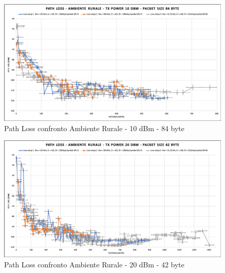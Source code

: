 \documentclass[12pt,a4paper,openright,twoside]{report}
\begin{document}
\begin{figure}[h]                      
\begin{center} 
\includegraphics[width=\textwidth]{PATH_LOSS_confronto_AR_10dBm_84byte.png}
\caption[Path Loss confronto Ambiente Rurale - 10 dBm - 84 byte]{Path Loss confronto Ambiente Rurale - 10 dBm - 84 byte}\label{fig:prima}
\end{center}
\end{figure}

\begin{figure}[h]                      
\begin{center} 
\includegraphics[width=\textwidth]{PATH_LOSS_confronto_AR_20dBm_42byte.png}
\caption[Path Loss confronto Ambiente Rurale - 20 dBm - 42 byte]{Path Loss confronto Ambiente Rurale - 20 dBm - 42 byte}\label{fig:prima}
\end{center}
\end{figure}
\end{document}
